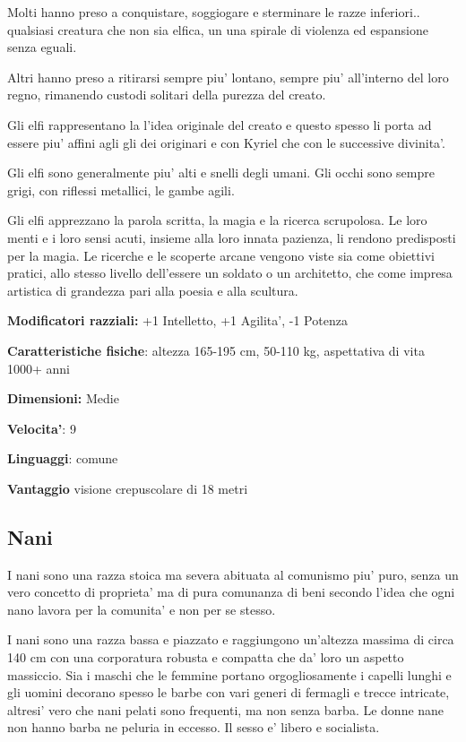 \documentclass[a4paper,11pt,twoside,openany]{dndbook}
\begin{document}
Molti hanno preso a conquistare, soggiogare e sterminare le razze inferiori.. qualsiasi creatura che non sia elfica, un una spirale di violenza ed espansione senza eguali.

Altri hanno preso a ritirarsi sempre piu' lontano, sempre piu' all'interno del loro regno, rimanendo custodi solitari della purezza del creato. 

Gli elfi rappresentano la l'idea originale del creato e questo spesso li porta ad essere piu' affini agli gli dei originari e con Kyriel che con le successive divinita'.

Gli elfi sono generalmente piu' alti e snelli degli umani. Gli occhi sono sempre grigi, con riflessi metallici, le gambe agili.

Gli elfi apprezzano la parola scritta, la magia e la ricerca scrupolosa. Le loro menti e i loro sensi acuti, insieme alla loro innata pazienza, li rendono predisposti per la magia. Le ricerche e le scoperte arcane vengono viste sia come obiettivi pratici, allo stesso livello dell'essere un soldato o un architetto, che come impresa artistica di grandezza pari alla poesia e alla scultura.

\textbf{Modificatori razziali:} +1 Intelletto, +1 Agilita', -1 Potenza

\textbf{Caratteristiche fisiche}: altezza 165-195 cm, 50-110 kg, aspettativa
di vita 1000+ anni

\textbf{Dimensioni:} Medie

\textbf{Velocita'}: 9

\textbf{Linguaggi}: comune

\textbf{Vantaggio} visione crepuscolare di 18 metri

\subsection{Nani}

\label{nani}

I nani sono una razza stoica ma severa abituata al comunismo piu' puro, senza un vero concetto di proprieta' ma di pura comunanza di beni secondo l'idea che ogni nano lavora per la comunita' e non per se stesso.

I nani sono una razza bassa e piazzato e raggiungono un'altezza massima di circa 140 cm con una corporatura robusta e compatta che da' loro un aspetto massiccio. Sia i maschi che le femmine portano orgogliosamente i capelli lunghi e gli uomini decorano spesso le barbe con vari generi di fermagli e trecce intricate, altresi' vero che nani pelati sono frequenti, ma non senza barba. Le donne nane non hanno barba ne peluria in eccesso. Il sesso e' libero e socialista.
\end{document}
